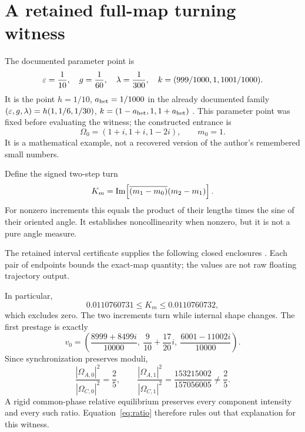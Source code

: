 \documentclass[11pt,a4paper]{article}
\numberwithin{equation}{section}
\theoremstyle{remark}\newtheorem{remark}[theorem]{Remark}
\begin{document}
\section{A retained full-map turning witness}\label{sec:witness}

The documented parameter point is
\begin{equation}
\varepsilon=\frac1{10},\quad g=\frac1{60},\quad\lambda=\frac1{300},
\quad k=(999/1000,1,1001/1000).\label{eq:parameters}
\end{equation}
It is the point $h=1/10$, $a_{\rm het}=1/1000$ in the already documented family $(\varepsilon,g,\lambda)=h(1,1/6,1/30)$, $k=(1-a_{\rm het},1,1+a_{\rm het})$ \cite[labels D2 and D41]{drift}. This parameter point was fixed before evaluating the witness; the constructed entrance is
\begin{equation}
\Omega_0=(1+i,1+i,1-2i),\qquad m_0=1.\label{eq:entrance}
\end{equation}
It is a mathematical example, not a recovered version of the author's remembered small numbers.

Define the signed two-step turn
\begin{equation}
K_m=\operatorname{Im}\!\left[\overline{(m_1-m_0)}(m_2-m_1)\right].\label{eq:turn}
\end{equation}
For nonzero increments this equals the product of their lengths times the sine of their oriented angle. It establishes noncollinearity when nonzero, but it is not a pure angle measure.

The retained interval certificate supplies the following closed enclosures \cite{turnreceipt}. Each pair of endpoints bounds the exact-map quantity; the values are not raw floating trajectory output.
\begin{table}[htbp]\centering\small
\caption{Certified collective increments for the full map.}

\end{table}

In particular,
\begin{equation}
0.0110760731\le K_m\le0.0110760732,\label{eq:certturn}
\end{equation}
which excludes zero. The two increments turn while internal shape changes. The first prestage is exactly
\begin{equation}
v_0=\left(\frac{8999+8499i}{10000},\ \frac{9}{10}+\frac{17}{20}i,
\ \frac{6001-11002i}{10000}\right).
\end{equation}
Since synchronization preserves moduli,
\begin{equation}
\frac{|\Omega_{A,0}|^2}{|\Omega_{C,0}|^2}=\frac25,
\qquad
\frac{|\Omega_{A,1}|^2}{|\Omega_{C,1}|^2}
=\frac{153215002}{157056005}\ne\frac25.\label{eq:ratio}
\end{equation}
A rigid common-phase relative equilibrium preserves every component intensity and every such ratio. Equation~\eqref{eq:ratio} therefore rules out that explanation for this witness.
\end{document}
